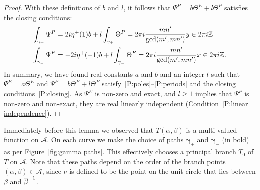 \documentclass{article}
\begin{document}
\begin{lem}
\begin{proof}
With these definitions of $b$ and $l$, it follows that $\Psi^P = b \Theta^E + l \Theta^P$ satisfies the closing conditions:
\begin{align*}
\int_{\gamma_+} \Psi^P
&= 2i \eta^+(1) b + l \int_{\gamma_+} \Theta^P
= 2\pi i \frac{mn'}{\gcd(m',mn')}y \in 2\pi i \mathbb{Z} \\
\int_{\gamma_-} \Psi^P
&= -2i \eta^+(-1) b + l \int_{\gamma_-} \Theta^P
= 2\pi i \frac{mn'}{\gcd(m',mn')}x \in 2\pi i \mathbb{Z}.
\end{align*}
In summary, we have found real constants $a$ and $b$ and an integer $l$ such that $\Psi^E = a\Theta^E$ and $\Psi^P = b\Theta^E + l\Theta^P$ satisfy~\ref{P:poles}--\ref{P:periods} and the closing conditions~\ref{P:closing}. As $\Psi^E$ is non-zero and exact, and $l\geq 1$ implies that $\Psi^P$ is non-zero and non-exact, they are real linearly independent (Condition~\ref{P:linear independence}).
\end{proof}
\end{lem}


Immediately before this lemma we observed that $T(\alpha,\beta)$ is a multi-valued function on $\mathcal{A}$. 
On each curve we make the choice of paths $\boldsymbol{\gamma}_+$ and $\boldsymbol{\gamma}_-$ (in bold) as per Figure~\ref{fig:gamma paths}. This effectively chooses a principal branch $T_0$ of $T$ on $\mathcal{A}$. Note that these paths depend on the order of the branch points $(\alpha,\beta) \in \mathcal{A}$, since $\nu$ is defined to be the point on the unit circle that lies between $\beta$ and $\overline{\beta}^{-1}$.
\end{document}
